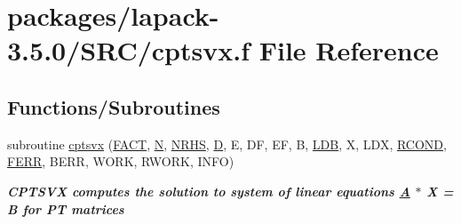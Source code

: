 \hypertarget{cptsvx_8f}{}\section{packages/lapack-\/3.5.0/\+S\+R\+C/cptsvx.f File Reference}
\label{cptsvx_8f}
\subsection*{Functions/\+Subroutines}
\begin{DoxyCompactItemize}
\item 
subroutine \hyperlink{group__complexPTsolve_ga32f573f1f8ee1da3094e15474bbcc0fe}{cptsvx} (\hyperlink{superlu__enum__consts_8h_af00a42ecad444bbda75cde1b64bd7e72a1b6692b56d378abb85bd49063721d034}{F\+A\+C\+T}, \hyperlink{polmisc_8c_a0240ac851181b84ac374872dc5434ee4}{N}, \hyperlink{example__user_8c_aa0138da002ce2a90360df2f521eb3198}{N\+R\+H\+S}, \hyperlink{odrpack_8h_a7dae6ea403d00f3687f24a874e67d139}{D}, E, D\+F, E\+F, B, \hyperlink{example__user_8c_a50e90a7104df172b5a89a06c47fcca04}{L\+D\+B}, X, L\+D\+X, \hyperlink{superlu__enum__consts_8h_af00a42ecad444bbda75cde1b64bd7e72a9b5c151728d8512307565994c89919d5}{R\+C\+O\+N\+D}, \hyperlink{superlu__enum__consts_8h_af00a42ecad444bbda75cde1b64bd7e72a78fd14d7abebae04095cfbe02928f153}{F\+E\+R\+R}, B\+E\+R\+R, W\+O\+R\+K, R\+W\+O\+R\+K, I\+N\+F\+O)
\begin{DoxyCompactList}\small\item\em {\bfseries  C\+P\+T\+S\+V\+X computes the solution to system of linear equations \hyperlink{classA}{A} $\ast$ X = B for P\+T matrices} \end{DoxyCompactList}\end{DoxyCompactItemize}
